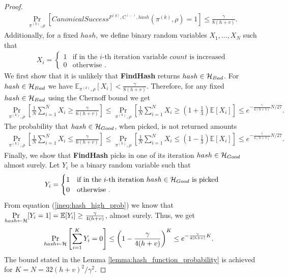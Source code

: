 \begin{proof}
\begin{align*}
\underset{\pi^{(k)}, \rho}{\Pr}\left[CanonicalSuccess^{P^{(g)}, C^{(\cdot, \cdot)}, hash}(\pi^{(k)}, \rho) = 1\right] \leq \frac{\gamma}{8(h+v)}.
\end{align*}
Additionally, for a fixed $hash$, we define binary random variables $X_1, \dots, X_N$ such that
\begin{align*}
  X_i =
  \begin{cases}
    1 & \text{if in the $i$-th iteration variable $count$ is increased}\\
    0 & \text{otherwise .}
  \end{cases}
\end{align*}
We first show that it is unlikely that \textbf{FindHash} returns $hash \in \mathcal{H}_{Bad}$.
For $hash \in \mathcal{H}_{Bad}$ we have $\mathbb{E}_{\pi^{(k)},\rho}[X_i] < \frac{\gamma}{8(h+v)}$.
Therefore, for any fixed $hash \in \mathcal{H}_{Bad}$ using the Chernoff bound we get
\begin{align*}
  \underset{\pi^{(k)},\rho}{\Pr} \left[\frac{1}{N} \sum_{i=1}^{N} X_i \geq \frac{\gamma}{6(h+v)} \right] \leq
  \underset{\pi^{(k)}, \rho}{\Pr}\left[\frac{1}{N} \sum_{i=1}^{N} X_i \geq (1 + \frac{1}{3}) \mathbb{E}[X_i]\right] \leq
  e^{-{\frac{\gamma}{4(h+v)}} N /27}.
\end{align*}
%
The probability that $hash \in \mathcal{H}_{Good}$, when picked, is not returned amounts
\begin{align*}
  \underset{\pi^{(k)}, \rho}{\Pr}\left[\frac{1}{N} \sum_{i=1}^{N} X_i \leq \frac{\gamma}{6(h+v)}\right] \leq
  \underset{\pi^{(k)}, \rho}{\Pr}\left[\frac{1}{N} \sum_{i=1}^{N} X_i \leq (1 - \frac{1}{3})\mathbb{E}[X_i]\right] \leq e^{-{\frac{\gamma}{4(h+v)}} N /27}.
\end{align*}
%
Finally, we show that \textbf{FindHash} picks in one of its iteration $hash \in \mathcal{H}_{Good}$ almost surely.
Let $Y_i$ be a binary random variable such that
\begin{align*}
  Y_i =
  \begin{cases}
    1 & \text{if in the $i$-th iteration $hash \in \mathcal{H}_{Good}$ is picked} \\
    0 & \text{otherwise .}
  \end{cases}
\end{align*}
From equation (\ref{ineq:hash_high_prob}) we know that $\underset{hash \leftarrow \mathcal{H}}{\Pr}[Y_i = 1] = \mathbb{E}[Y_i] \geq \frac{\gamma}{4(h+v)}$, almost surely.
Thus, we get
\begin{align*}
  \underset{hash \leftarrow \mathcal{H}}{\Pr}\left[\sum_{i=1}^{K} Y_i = 0\right] &\leq \left(1 - \frac{\gamma}{4(h+v)}\right)^{K} \leq e^{-\frac{\gamma}{4(h+v)} K}.
\end{align*}
The bound stated in the Lemma \ref{lemma:hash_function_probability} is achieved for $K = N = 32(h+v)^2/\gamma^2$.
\end{proof}
